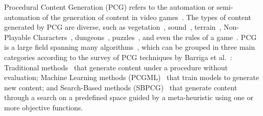 Procedural Content Generation (PCG) refers to the automation or semi-automation of the generation of content in video games~\cite{hendrikx2013procedural}. The types of content generated by PCG are diverse, such as vegetation~\cite{mora2021flora}, sound~\cite{plans2012experience}, terrain~\cite{frade2009breeding}, Non-Playable Characters~\cite{viana2022illuminating}, dungeons~\cite{viana2019survey}, puzzles~\cite{de2019procedural}, and even the rules of a game~\cite{browne2008automatic}. PCG is a large field spanning many algorithms~\cite{yannakakis2018artificial}, which can be grouped in three main categories according to the survey of PCG techniques by Barriga et al.~\cite{Barriga2019}: Traditional methods~\cite{freiknecht2017survey} that generate content under a procedure without evaluation; Machine Learning methods (PCGML)~\cite{Summerville2018,liu2021deep,souchleris2023reinforcement} that train models to generate new content; and Search-Based methods (SBPCG)~\cite{hendrikx2013procedural,togelius2011search} that generate content through a search on a predefined space guided by a meta-heuristic using one or more objective functions. 


